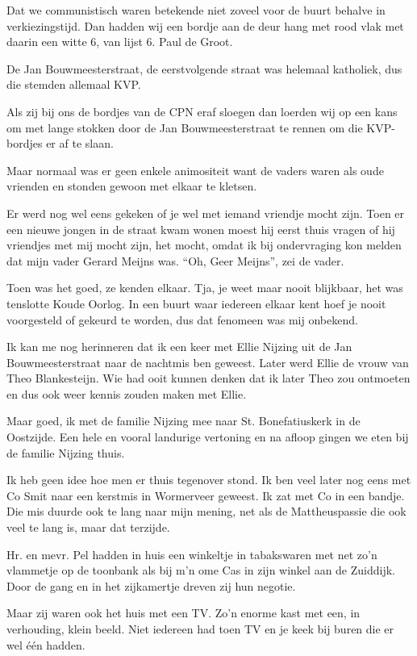 \documentclass[10pt,twoside,openright]{memoir}
\begin{document}
Dat we communistisch waren betekende niet zoveel voor de buurt behalve in verkiezingstijd. Dan hadden wij een bordje aan de deur hang met rood vlak met daarin een witte 6, van lijst 6. Paul de Groot. 

De Jan Bouwmeesterstraat, de eerstvolgende straat was helemaal katholiek, dus die stemden allemaal KVP. 

Als zij bij ons de bordjes van de CPN eraf sloegen dan loerden wij op een kans om met lange stokken door de Jan Bouwmeesterstraat te rennen om die KVP-bordjes er af te slaan.

Maar normaal was er geen enkele animositeit want de vaders waren als oude vrienden en stonden gewoon met elkaar te kletsen. 

Er werd nog wel eens gekeken of je wel met iemand vriendje mocht zijn. Toen er een nieuwe jongen in de straat kwam wonen moest hij eerst thuis vragen of hij vriendjes met mij mocht zijn, het mocht, omdat ik bij ondervraging kon melden dat mijn vader Gerard Meijns was. “Oh, Geer Meijns”, zei de vader. 

Toen was het goed, ze kenden elkaar. Tja, je weet maar nooit blijkbaar, het was tenslotte Koude Oorlog. In een buurt waar iedereen elkaar kent hoef je nooit voorgesteld of gekeurd te worden, dus dat fenomeen was mij onbekend.

Ik kan me nog herinneren dat ik een keer met Ellie Nijzing uit de Jan Bouwmeesterstraat naar de nachtmis ben geweest. Later werd Ellie de vrouw van Theo Blankesteijn. Wie had ooit kunnen denken dat ik later Theo zou ontmoeten en dus ook weer kennis zouden maken met Ellie. 

Maar goed, ik met de familie Nijzing mee naar St. Bonefatiuskerk in de Oostzijde. Een hele en vooral landurige vertoning en na afloop gingen we eten bij de familie Nijzing thuis. 

Ik heb geen idee hoe men er thuis tegenover stond. Ik ben veel later nog eens met Co Smit naar een kerstmis in Wormerveer geweest. Ik zat met Co in een bandje. Die mis duurde ook te lang naar mijn mening, net als de Mattheuspassie die ook veel te lang is, maar dat terzijde.

Hr. en mevr. Pel hadden in huis een winkeltje in tabakswaren met net zo'n vlammetje op de toonbank als bij m'n ome Cas in zijn winkel aan de Zuiddijk. Door de gang en in het zijkamertje dreven zij hun negotie. 

Maar zij waren ook het huis met een TV. Zo’n enorme kast met een, in verhouding, klein beeld. Niet iedereen had toen TV en je keek bij buren die er wel één hadden.
\end{document}
